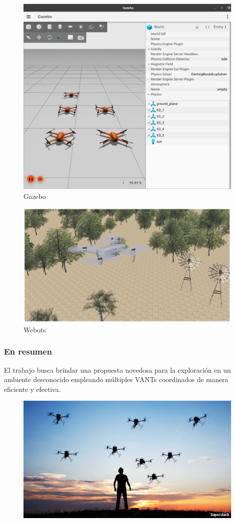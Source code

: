 \documentclass[
	11pt, %
]{beamer}
\begin{document}
\begin{frame}
  \begin{figure}
    \includegraphics[width=0.7\linewidth]{gazebo.png}
    \caption{Gazebo}
  \end{figure}
\end{frame}

\begin{frame}
  \begin{figure}
    \includegraphics[width=0.7\linewidth]{webots.png}
    \caption{Webots}
  \end{figure}
\end{frame}

\begin{frame}

  \frametitle{En resumen}
  El trabajo busca brindar una propuesta novedosa para la exploración en un ambiente desconocido empleando múltiples VANTs coordinados de manera eficiente y efectiva.

  \begin{figure}[h]
    \includegraphics[width=0.7\linewidth]{swarm}
  \end{figure}
  
\end{frame}
\end{document}
